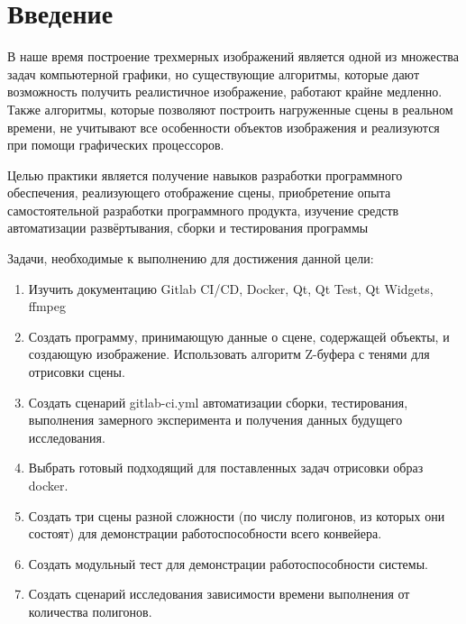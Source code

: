 \documentclass[a4paper,14pt]{extreport}
\begin{document}
	
		

		
		
		\setcounter{page}{3}
		\renewcommand{\contentsname}{Содержание} %
		\tableofcontents

		\thispagestyle{empty}
		\chapter*{Введение}
		В наше время построение трехмерных изображений является одной из
			множества задач компьютерной графики, но существующие алгоритмы,
			которые дают возможность получить реалистичное изображение, работают
			крайне медленно. Также алгоритмы, которые позволяют построить
			нагруженные сцены в реальном времени, не учитывают все особенности
			объектов изображения и реализуются при помощи графических процессоров.
		\par Целью практики является получение навыков разработки программного 
			обеспечения, реализующего отображение сцены, приобретение опыта 
			самостоятельной разработки программного продукта, изучение средств 
			автоматизации развёртывания, сборки и тестирования программы
		\par Задачи, необходимые к выполнению для достижения данной цели:
		\begin{enumerate} 
        			\item Изучить документацию Gitlab CI/CD, Docker, Qt, Qt Test, Qt Widgets, ffmpeg
        			\item Создать программу, принимающую данные о сцене, содержащей 
				объекты, и создающую изображение. Использовать алгоритм Z-буфера с тенями для отрисовки сцены.
			\item Создать сценарий gitlab-ci.yml автоматизации сборки, тестирования, 
				выполнения замерного эксперимента и получения данных будущего 
				исследования.
			\item Выбрать готовый подходящий для поставленных задач отрисовки образ 
				docker.
			\item Создать три сцены разной сложности (по числу 
				полигонов, из которых они состоят) для демонстрации 
				работоспособности всего конвейера.
			\item Создать модульный тест для демонстрации работоспособности системы.
			\item Создать сценарий исследования зависимости времени выполнения от 
				количества полигонов.
    		\end{enumerate} 
		
\end{document}
